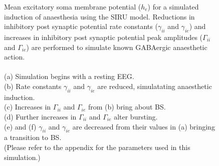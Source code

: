 \documentclass[a4paper,12pt]{article}
\begin{document}
\begin{figure}
	\label{fig:intra_gamma}
	\caption{Mean excitatory soma membrane potential ($h_e$) for a simulated induction of anaesthesia using the SIRU model. 
Reductions in inhibitory post synaptic potential rate constants ($\gamma_{ii}$ and $\gamma_{ie}$) and increases in inhibitory post synaptic potential peak amplitudes ($\Gamma_{ii}$ and $\Gamma_{ie}$) are performed to simulate known GABAergic anaesthetic action.
\\
\\
(a) Simulation begins with a resting EEG.\\ 
(b) Rate constants $\gamma_{ii}$ and $\gamma_{ie}$ are reduced, simulatating anaesthetic induction. \\
(c) Increases in $\Gamma_{ii}$ and $\Gamma_{ie}$  from (b) bring about BS.\\
(d) Further increases in $\Gamma_{ii}$ and $\Gamma_{ie}$ alter bursting. \\
(e) and (f) $\gamma_{ii}$ and $\gamma_{ie}$ are decreased from their values in (a) bringing a transition to BS.\\
(Please refer to the appendix for the parameters used in this simulation.)\\
}
\end{figure}
\end{document}
